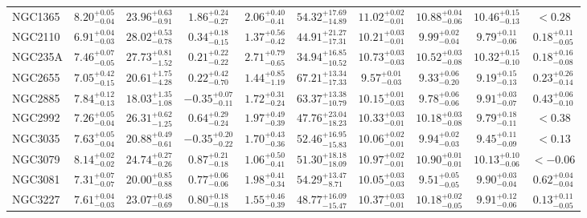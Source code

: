 \documentclass[onecolumn]{mn2e}
\begin{document}
\begin{landscape}
{\begin{center}
\begin{longtable}{lccccccccc}
NGC1365 & $8.20_{-0.04}^{+0.05}$ & $23.96_{-0.91}^{+0.63}$ & $1.86_{-0.27}^{+0.24}$ & $2.06_{-0.41}^{+0.40}$ &$54.32_{-14.89}^{+17.69}$ & $11.02_{-0.01}^{+0.02}$ & $10.88_{-0.06}^{+0.04}$ & $10.46_{-0.13}^{+0.15}$ & $<0.28$ \\
NGC2110 & $6.91_{-0.03}^{+0.04}$ & $28.02_{-0.78}^{+0.53}$ & $0.34_{-0.15}^{+0.18}$ & $1.37_{-0.42}^{+0.56}$ &$44.91_{-17.31}^{+21.27}$ & $10.21_{-0.01}^{+0.03}$ & $9.99_{-0.04}^{+0.02}$ & $9.79_{-0.06}^{+0.11}$ & $0.18_{-0.05}^{+0.11}$ \\
NGC235A & $7.46_{-0.05}^{+0.07}$ & $27.73_{-1.52}^{+0.81}$ & $0.21_{-0.22}^{+0.22}$ & $2.71_{-0.65}^{+0.79}$ &$34.94_{-10.52}^{+16.85}$ & $10.73_{-0.03}^{+0.03}$ & $10.52_{-0.08}^{+0.03}$ & $10.32_{-0.10}^{+0.15}$ & $0.18_{-0.08}^{+0.16}$ \\
NGC2655 & $7.05_{-0.15}^{+0.42}$ & $20.61_{-4.28}^{+1.75}$ & $0.22_{-0.70}^{+0.42}$ & $1.44_{-1.19}^{+0.85}$ &$67.21_{-17.33}^{+13.34}$ & $9.57_{-0.03}^{+0.01}$ & $9.33_{-0.20}^{+0.06}$ & $9.19_{-0.13}^{+0.15}$ & $0.23_{-0.14}^{+0.26}$ \\
NGC2885 & $7.84_{-0.13}^{+0.12}$ & $18.03_{-1.08}^{+1.35}$ & $-0.35_{-0.11}^{+0.07}$ & $1.72_{-0.24}^{+0.31}$ &$63.37_{-10.79}^{+13.38}$ & $10.15_{-0.03}^{+0.01}$ & $9.78_{-0.06}^{+0.06}$ & $9.91_{-0.07}^{+0.03}$ & $0.43_{-0.10}^{+0.06}$ \\
NGC2992 & $7.26_{-0.04}^{+0.05}$ & $26.31_{-1.25}^{+0.62}$ & $0.64_{-0.24}^{+0.29}$ & $1.97_{-0.39}^{+0.49}$ &$47.76_{-18.23}^{+23.04}$ & $10.33_{-0.01}^{+0.03}$ & $10.18_{-0.08}^{+0.03}$ & $9.79_{-0.11}^{+0.18}$ & $<0.38$ \\
NGC3035 & $7.63_{-0.04}^{+0.05}$ & $20.88_{-0.61}^{+0.49}$ & $-0.35_{-0.22}^{+0.20}$ & $1.70_{-0.36}^{+0.43}$ &$52.46_{-15.83}^{+16.95}$ & $10.06_{-0.01}^{+0.02}$ & $9.94_{-0.03}^{+0.02}$ & $9.45_{-0.09}^{+0.11}$ & $<0.13$ \\
NGC3079 & $8.14_{-0.02}^{+0.02}$ & $24.74_{-0.26}^{+0.27}$ & $0.87_{-0.18}^{+0.21}$ & $1.06_{-0.41}^{+0.50}$ &$51.30_{-18.09}^{+18.18}$ & $10.97_{-0.01}^{+0.02}$ & $10.90_{-0.01}^{+0.01}$ & $10.13_{-0.06}^{+0.10}$ & $<-0.06$ \\
NGC3081 & $7.31_{-0.07}^{+0.07}$ & $20.00_{-0.88}^{+0.85}$ & $0.77_{-0.06}^{+0.06}$ & $1.98_{-0.34}^{+0.41}$ &$54.29_{-8.71}^{+13.47}$ & $10.05_{-0.03}^{+0.03}$ & $9.51_{-0.05}^{+0.05}$ & $9.90_{-0.04}^{+0.03}$ & $0.62_{-0.04}^{+0.04}$ \\
NGC3227 & $7.61_{-0.03}^{+0.04}$ & $23.07_{-0.69}^{+0.48}$ & $0.80_{-0.18}^{+0.18}$ & $1.55_{-0.39}^{+0.46}$ &$48.77_{-15.47}^{+16.09}$ & $10.37_{-0.01}^{+0.03}$ & $10.18_{-0.05}^{+0.02}$ & $9.91_{-0.06}^{+0.12}$ & $0.13_{-0.05}^{+0.11}$ \\

\end{longtable}
\end{center}}
\end{landscape}
\end{document}

